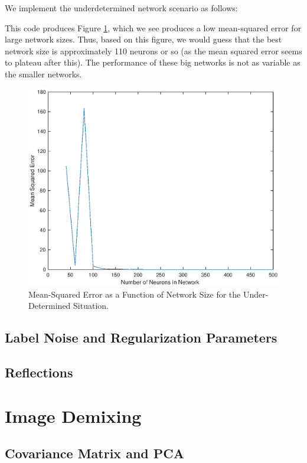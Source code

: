 \documentclass[11pt, oneside]{article}
\begin{document}
We implement the underdetermined network scenario as follows:

This code produces Figure \ref{fig:underdetermined}, which we see produces a low mean-squared error for large network sizes. Thus, based on this figure, we would guess that the best network size is approximately 110 neurons or so (as the mean squared error seems to plateau after this). The performance of these big networks is not as variable as the smaller networks.

\begin{figure}[ht!]
\includegraphics[width=1\textwidth]{Q2PartC.eps}
\caption{Mean-Squared Error as a Function of Network Size for the Under-Determined Situation.}
\label{fig:underdetermined}
\end{figure}

\subsection{Label Noise and Regularization Parameters}

\subsection{Reflections}

\section{Image Demixing}

\subsection{Covariance Matrix and PCA}
\end{document}
